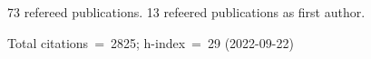 73 refereed publications. 13 refeered publications as first author.

Total citations~=~2825; h-index~=~29 (2022-09-22)